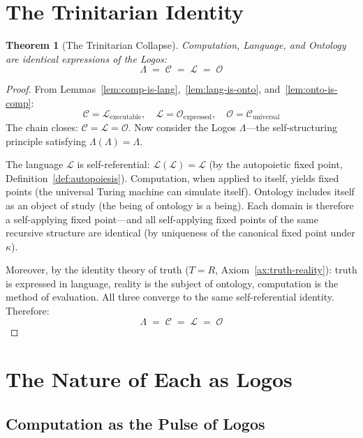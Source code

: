 \documentclass[12pt, letterpaper]{book}
\def\equiv{=}%
\newtheorem{theorem}{Theorem}[chapter]
\begin{document}
\section{The Trinitarian Identity}

\begin{theorem}[The Trinitarian Collapse]\label{thm:trinitarian}
Computation, Language, and Ontology are identical expressions of the Logos:
\[
\Lambda \;\equiv\; \mathcal{C} \;\equiv\; \mathcal{L} \;\equiv\; \mathcal{O}
\]
\end{theorem}

\begin{proof}
From Lemmas~\ref{lem:comp-is-lang},~\ref{lem:lang-is-onto}, and~\ref{lem:onto-is-comp}:
\[
\mathcal{C} \equiv \mathcal{L}_{\mathrm{executable}}, \quad \mathcal{L} \equiv \mathcal{O}_{\mathrm{expressed}}, \quad \mathcal{O} \equiv \mathcal{C}_{\mathrm{universal}}
\]
The chain closes: $\mathcal{C} \equiv \mathcal{L} \equiv \mathcal{O}$. Now consider the Logos $\Lambda$---the self-structuring principle satisfying $\Lambda(\Lambda) \equiv \Lambda$.

The language $\mathcal{L}$ is self-referential: $\mathcal{L}(\mathcal{L}) \equiv \mathcal{L}$ (by the autopoietic fixed point, Definition~\ref{def:autopoiesis}). Computation, when applied to itself, yields fixed points (the universal Turing machine can simulate itself). Ontology includes itself as an object of study (the being of ontology is a being). Each domain is therefore a self-applying fixed point---and all self-applying fixed points of the same recursive structure are identical (by uniqueness of the canonical fixed point under $\kappa$).

Moreover, by the identity theory of truth ($T \equiv R$, Axiom~\ref{ax:truth-reality}): truth is expressed in language, reality is the subject of ontology, computation is the method of evaluation. All three converge to the same self-referential identity. Therefore:
\[
\Lambda \;\equiv\; \mathcal{C} \;\equiv\; \mathcal{L} \;\equiv\; \mathcal{O}
\]
\end{proof}

\section{The Nature of Each as Logos}

\subsection{Computation as the Pulse of Logos}
\end{document}
